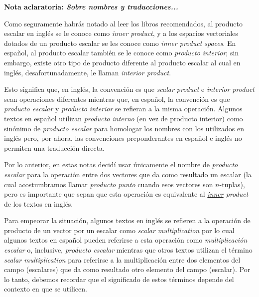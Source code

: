 \begin{tcolorbox}
\begin{center}
    \textbf{Nota aclaratoria: \emph{Sobre nombres y traducciones...}}
\end{center}

\hspace{2.5mm}Como seguramente habrás notado al leer los libros recomendados, al producto escalar en inglés se le conoce como \emph{inner product}, y a los espacios vectoriales dotados de un producto escalar se les conoce como \emph{inner product spaces}. En español, al producto escalar también se le conoce como \emph{producto interior}; sin embargo, existe otro tipo de producto diferente al producto escalar al cual en inglés, desafortunadamente, le llaman \emph{interior product}.

\vspace{5mm}
\hspace{2.5mm}Esto significa que, en inglés, la convención es que \emph{scalar product} e \emph{interior product} sean operaciones diferentes mientras que, en español, la convención es que \emph{producto escalar} y \emph{producto interior} se refieran a la misma operación. Algunos textos en español utilizan \emph{producto interno} (en vez de producto interior) como sinónimo de \emph{producto escalar} para homologar los nombres con los utilizados en inglés pero, por ahora, las convenciones preponderantes en español e inglés no permiten una traducción directa.

\vspace{5mm}
\hspace{2.5mm}Por lo anterior, en estas notas decidí usar únicamente el nombre de \emph{producto escalar} para la operación entre dos vectores que da como resultado un escalar (la cual acostumbramos llamar \emph{producto punto} cuando esos vectores son $n$-tuplas), pero es importante que sepan que esta operación es equivalente al \emph{\underline{inner} product} de los textos en inglés.

\vspace{5mm}
\hspace{2.5mm} Para empeorar la situación, algunos textos en inglés se refieren a la operación de producto de un vector por un escalar como \emph{scalar multiplication} \textemdash por lo cual algunos textos en español pueden referirse a esta operación como \emph{multiplicación escalar} o, inclusive, \emph{producto escalar}\textemdash \hspace{0.5mm} mientras que otros textos utilizan el término \emph{scalar multiplication} para referirse a la multiplicación entre dos elementos del campo (escalares) que da como resultado otro elemento del campo (escalar). Por lo tanto, debemos recordar que el significado de estos términos depende del contexto en que se utilicen. 


\end{tcolorbox}
